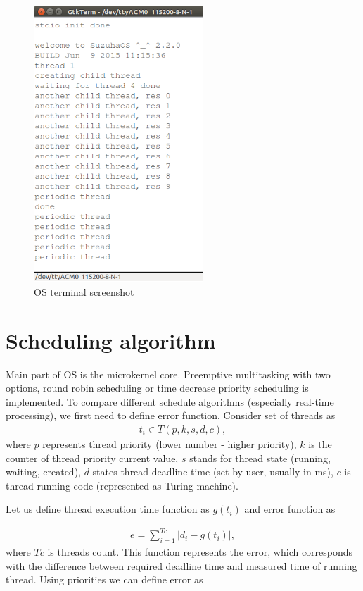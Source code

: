 \documentclass[a4paper, conference]{IEEEtran}
\begin{document}
\begin{figure}[!t]
\centering
\includegraphics[width=2.5in]{threads.png}
\caption{OS terminal screenshot}
\label{fig_os_terminal}
\end{figure}

\section{Scheduling algorithm}

Main part of OS is the microkernel core. Preemptive multitasking with two options, round robin scheduling or time decrease
priority scheduling is implemented. To compare different schedule algorithms (especially real-time processing), we first need to define error function. Consider set of threads as
\begin{align}
\label{thread}
t_i \in T(p, k, s, d, c) ,
\end{align}
where
$p$ represents thread priority (lower number - higher priority),
$k$ is the counter of thread priority current value,
$s$ stands for thread state (running, waiting, created),
$d$ states thread deadline time (set by user, usually in ms),
$c$ is thread running code (represented as Turing machine).

Let us define thread execution time function as $g(t_i)$ and error function as

\begin{align}
e = \sum_{i=1}^{Tc} |d_i - g(t_i)| ,
\end{align}
where $Tc$ is threads count. This function represents the error, which corresponds with the difference between required deadline time and measured time of running thread.
Using priorities we can define error as
\end{document}
